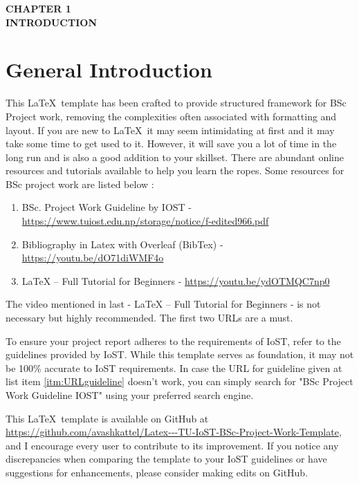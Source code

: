 \thispagestyle{plain}
\begin{center}
\LARGE \bf {CHAPTER 1} \\
\vspace{15pt}
\Large \bf {INTRODUCTION} \\
\end{center}
\section{General Introduction}
This \LaTeX\ template has been crafted to provide structured framework for BSc Project work, removing the complexities often associated with formatting and layout. If you are new to \LaTeX\, it may seem intimidating at first and it may take some time to get used to it. However, it will save you a lot of time in the long run and is also a good addition to your skillset. There are abundant online resources and tutorials available to help you learn the ropes. Some resources for BSc project work are listed below :
\begin{enumerate}
    \item BSc. Project Work Guideline by IOST - \url{https://www.tuiost.edu.np/storage/notice/f-edited966.pdf} \label{itm:URLguideline}
    \item Bibliography in Latex with Overleaf (BibTex) - \url{https://youtu.be/dO71diWMF4o}
    \item LaTeX – Full Tutorial for Beginners - \url{https://youtu.be/ydOTMQC7np0}
\end{enumerate}
The video mentioned in last - LaTeX – Full Tutorial for Beginners - is not necessary but highly recommended. The first two URLs are a must.

To ensure your project report adheres to the requirements of IoST, refer to the guidelines provided by IoST. While this template serves as foundation, it may not be 100\% accurate to IoST requirements. In case the URL for guideline given at list item \ref{itm:URLguideline} doesn't work, you can simply search for "BSc Project Work Guideline IOST" using your preferred search engine.

This \LaTeX\ template is available on GitHub at \url{https://github.com/avashkattel/Latex---TU-IoST-BSc-Project-Work-Template}, and I encourage every user to contribute to its improvement. If you notice any discrepancies when comparing the template to your IoST guidelines or have suggestions for enhancements, please consider making edits on GitHub.

